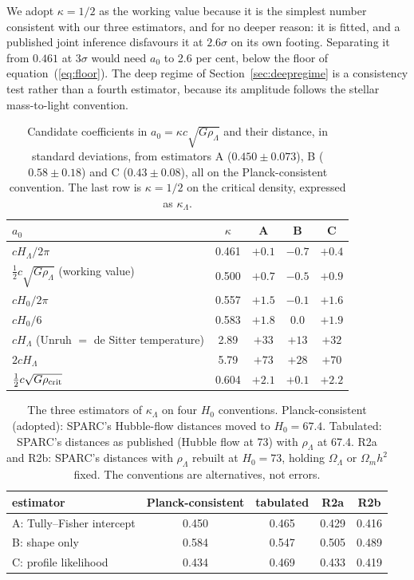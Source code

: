 \documentclass[fleqn,usenatbib]{mnras}
\begin{document}
We adopt $\kappa=1/2$ as the working value because it is the simplest number consistent with our three estimators, and for no deeper reason: it is fitted, and a published joint inference disfavours it at $2.6\sigma$ on its own footing. Separating it from $0.461$ at $3\sigma$ would need $a_0$ to 2.6 per cent, below the floor of equation~(\ref{eq:floor}). The deep regime of Section~\ref{sec:deepregime} is a consistency test rather than a fourth estimator, because its amplitude follows the stellar mass-to-light convention.

\begin{table}
\caption{Candidate coefficients in $a_0=\kappa c\sqrt{G\rho_\Lambda}$ and their distance, in standard deviations, from estimators A ($0.450\pm0.073$), B ($0.58\pm0.18$) and C ($0.43\pm0.08$), all on the Planck-consistent convention. The last row is $\kappa=1/2$ on the critical density, expressed as $\kappa_\Lambda$.}
\label{tab:cands}
\setlength{\tabcolsep}{3.5pt}
\begin{tabular}{@{}lcccc@{}}
\toprule
$a_0$ & $\kappa$ & A & B & C\\
\midrule
$cH_\Lambda/2\pi$ \citep{Milgrom2020} & 0.461 & $+0.1$ & $-0.7$ & $+0.4$ \\
$\tfrac12c\sqrt{G\rho_\Lambda}$ (working value) & 0.500 & $+0.7$ & $-0.5$ & $+0.9$ \\
$cH_0/2\pi$ \citep{Milgrom2020} & 0.557 & $+1.5$ & $-0.1$ & $+1.6$ \\
$cH_0/6$ \citep{Verlinde2017} & 0.583 & $+1.8$ & $0.0$ & $+1.9$ \\
$cH_\Lambda$ (Unruh $=$ de Sitter temperature) & 2.89 & $+33$ & $+13$ & $+32$ \\
$2cH_\Lambda$ \citep{Milgrom1999} & 5.79 & $+73$ & $+28$ & $+70$ \\
\midrule
$\tfrac12c\sqrt{G\rho_{\rm crit}}$ & 0.604 & $+2.1$ & $+0.1$ & $+2.2$ \\
\bottomrule
\end{tabular}
\end{table}

\begin{table}
\caption{The three estimators of $\kappa_\Lambda$ on four $H_0$ conventions. Planck-consistent (adopted): SPARC's Hubble-flow distances moved to $H_0=67.4$. Tabulated: SPARC's distances as published (Hubble flow at 73) with $\rho_\Lambda$ at 67.4. R2a and R2b: SPARC's distances with $\rho_\Lambda$ rebuilt at $H_0=73$, holding $\Omega_\Lambda$ or $\Omega_mh^2$ fixed. The conventions are alternatives, not errors.}
\label{tab:conv}
\setlength{\tabcolsep}{3.5pt}
\begin{tabular}{@{}lcccc@{}}
\toprule
estimator & Planck-consistent & tabulated & R2a & R2b\\
\midrule
A: Tully--Fisher intercept & 0.450 & 0.465 & 0.429 & 0.416 \\
B: shape only & 0.584 & 0.547 & 0.505 & 0.489 \\
C: profile likelihood & 0.434 & 0.469 & 0.433 & 0.419 \\
\bottomrule
\end{tabular}
\end{table}
\end{document}
